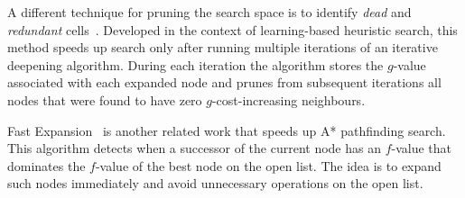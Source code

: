 A different technique for pruning the search space is to identify \emph{dead}
and \emph{redundant} cells~\citep{sturtevant10b}.  Developed in the context of
learning-based heuristic search, this method speeds up search only after
running multiple iterations of an iterative deepening algorithm.  During each
iteration the algorithm stores the $g$-value associated with each expanded
node and prunes from subsequent iterations all nodes that were found to have
zero $g$-cost-increasing neighbours.

Fast Expansion~\citep{sun09} is another related work that speeds up A{*}
pathfinding search.  This algorithm detects when a successor of the current
node has an $f$-value that dominates the $f$-value of the best node
on the open list. The idea is to expand such nodes immediately and avoid
unnecessary operations on the open list.

